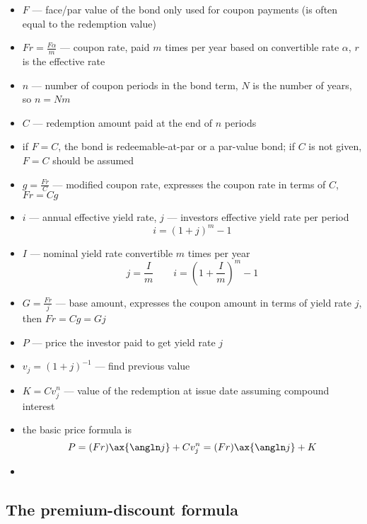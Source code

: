 \documentclass[../00_main.tex]{subfiles}
\begin{document}
\begin{itemize}
    \item $F$ --- face/par value of the bond only used for coupon payments (is
        often equal to the redemption value)
    \item $Fr=\frac{F\alpha}{m}$ --- coupon rate, paid $m$ times per year based
        on convertible rate $\alpha$, $r$ is the effective rate
    \item $n$ --- number of coupon periods in the bond term, $N$ is the number
        of years, so $n = Nm$
    \item $C$ --- redemption amount paid at the end of $n$ periods
    \item if $F=C$, the bond is redeemable-at-par or a par-value bond; if $C$
        is not given, $F=C$ should be assumed
    \item $g = \frac{Fr}{C}$ --- modified coupon rate, expresses the coupon
        rate in terms of $C$, $Fr = Cg$
    \item $i$ --- annual effective yield rate, $j$ --- investors effective
        yield rate per period
        \begin{equation}\nonumber
            i = (1 + j)^m - 1
        \end{equation}
    \item $I$ --- nominal yield rate convertible $m$ times per year
        \begin{equation}\nonumber
            j = \frac{I}{m} \qquad i = \left(1 + \frac{I}{m}\right)^m - 1
        \end{equation}
    \item $G = \frac{Fr}{j}$ --- base amount, expresses the coupon amount in 
        terms of yield rate $j$, then $Fr = Cg = Gj$
    \item $P$ --- price the investor paid to get yield rate $j$
    \item $v_j = (1 + j)^{-1}$ --- find previous value 
    \item $K = Cv_j^n$ --- value of the redemption at issue date assuming
        compound interest
    \item the basic price formula is 
        \begin{equation}\nonumber
            P = (Fr) \ax{\angln j} + Cv_j^n = (Fr) \ax{\angln j} + K
        \end{equation}
    \item 
\end{itemize}

\subsection{The premium-discount formula}
\end{document}
